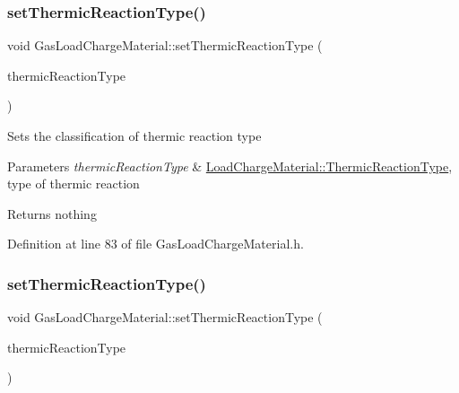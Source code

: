 \subsubsection{\texorpdfstring{set\+Thermic\+Reaction\+Type()}{setThermicReactionType()}\hspace{0.1cm}{\footnotesize\ttfamily [1/3]}}
{\footnotesize\ttfamily void Gas\+Load\+Charge\+Material\+::set\+Thermic\+Reaction\+Type (\begin{DoxyParamCaption}\item[{\hyperlink{class_load_charge_material_a51d4263e865a5d86236622dd3fe23fd1}{Load\+Charge\+Material\+::\+Thermic\+Reaction\+Type}}]{thermic\+Reaction\+Type }\end{DoxyParamCaption})\hspace{0.3cm}{\ttfamily [inline]}}

Sets the classification of thermic reaction type


\begin{DoxyParams}{Parameters}
{\em thermic\+Reaction\+Type} & \hyperlink{class_load_charge_material_a51d4263e865a5d86236622dd3fe23fd1}{Load\+Charge\+Material\+::\+Thermic\+Reaction\+Type}, type of thermic reaction\\
\hline
\end{DoxyParams}
\begin{DoxyReturn}{Returns}
nothing 
\end{DoxyReturn}


Definition at line 83 of file Gas\+Load\+Charge\+Material.\+h.

\mbox{\label{class_gas_load_charge_material_ac48eb07a3008f1dc0ff433353b59536d}} 
\subsubsection{\texorpdfstring{set\+Thermic\+Reaction\+Type()}{setThermicReactionType()}\hspace{0.1cm}{\footnotesize\ttfamily [2/3]}}
{\footnotesize\ttfamily void Gas\+Load\+Charge\+Material\+::set\+Thermic\+Reaction\+Type (\begin{DoxyParamCaption}\item[{\hyperlink{class_load_charge_material_a51d4263e865a5d86236622dd3fe23fd1}{Load\+Charge\+Material\+::\+Thermic\+Reaction\+Type}}]{thermic\+Reaction\+Type }\end{DoxyParamCaption})\hspace{0.3cm}{\ttfamily [inline]}}

